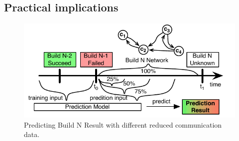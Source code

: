 \subsection{Practical implications}
\label{subsec:practicalimpl}

\begin{figure}[t]
\begin{center}
\includegraphics[width=\columnwidth]{figures/ReducedCommunicationInput}
\caption{Predicting Build N Result with different reduced communication
data.}
\label{fig:ReducedCommunicationInput}
\end{center}
\end{figure}




